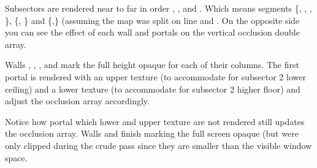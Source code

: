 Subsectors are rendered near to far in order , , and . Which means segments \{, , , \}, \{, \} and \{,\} (assuming the map was split on line  and . On the opposite side you can see the effect of each wall and portals on the vertical occlusion double array.\\
\par
Walls , , , and  mark the full height opaque for each of their columns. The first portal  is rendered with an upper texture (to accommodate for subsector 2 lower ceiling) and a lower texture (to accommodate for subsector 2 higher floor) and adjust the occlusion array accordingly.\\
\par
Notice how portal  which lower and upper texture are not rendered still updates the occlusion array. Walls  and  finish marking the full screen opaque (but were only clipped during the crude pass since they are smaller than the visible window space.


\par
 

\pagebreak












